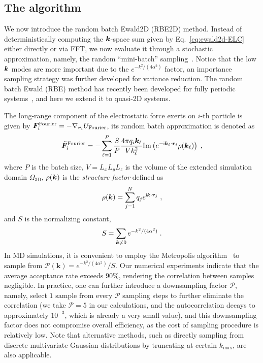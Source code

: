 \subsection{The algorithm}\label{subsec::RBE2D_algorithm}

We now introduce the random batch Ewald2D (RBE2D) method.
Instead of deterministically  {computing} the $\boldsymbol{k}$-space sum  {given by Eq.~\eqref{eq:ewald2d-ELC}} either directly or via FFT, we now evaluate it through a stochastic approximation, namely, the random ``mini-batch'' sampling~\cite{jin2020random}. 
Notice that the low $\boldsymbol{k}$ modes are more important due to the $e^{-k^2/(4\alpha^2)}$ factor, an importance sampling strategy was further developed for variance reduction.
The random batch Ewald (RBE) method has recently been developed for fully periodic systems~\cite{jin2021random,liang2022superscalability, liang2023random}, and here we extend it to quasi-2D systems.

The long-range component of the electrostatic force exerts on $i$-th particle is given by $\boldsymbol{F}_i^{\text{Fourier}}=-\nabla_{\bm{r}_i}U_{\text{Fourier}}$, its random batch approximation is denoted as
\begin{equation}\label{eq:forceRBE}
\begin{aligned}
    \boldsymbol{\tilde{F}}_i^{\text{Fourier}}=-\sum_{\ell =1}^P \frac{S}{P}\frac{4\pi q_i\boldsymbol{k}_\ell}{Vk_\ell^2} \text{Im}\left(e^{-\mathsf i \boldsymbol{k}_\ell\cdot \boldsymbol{r}_i}\rho(\boldsymbol{k}_\ell)\right)\;,
\end{aligned}
\end{equation}
where $P$ is the batch size, $V=L_xL_yL_z$ is the volume of the extended simulation domain $\Omega_{\text{3D}}$, 
 {
$\rho(\boldsymbol{k})$ is the \textit{structure factor} defined as
\begin{equation}
    \rho(\boldsymbol{k})=\sum_{j=1}^N q_j e^{\mathsf i \boldsymbol{k}\cdot \boldsymbol{r}_j}\;,
\end{equation}
}
and $S$ is the normalizing constant,
\begin{equation}\label{eq:normalizingS}
\begin{aligned}
S=\sum_{\boldsymbol{k} \neq 0} e^{-k^2/(4\alpha^2)}\;.
\end{aligned}
\end{equation}
In MD simulations, it is convenient to employ the Metropolis algorithm~\cite{metropolis1953equation} to sample from $\mathscr{P}(\bm{k})=e^{-k^2/(4\alpha^2)}/S$. 
 {Our numerical experiments indicate that the average acceptance rate exceeds $90\%$, rendering the correlation between samples negligible. In practice, one can further introduce a downsampling factor $\mathcal{P}$, namely, select $1$ sample from every $\mathcal{P}$ sampling steps to further eliminate the correlation (we take $\mathcal{P}=5$ in our calculations, and the autocorrelation decays to approximately $10^{-3}$, which is already a very small value), and this downsampling factor does not compromise overall efficiency, as the cost of sampling procedure is relatively low. Note that alternative methods, such as directly sampling from discrete multivariate Gaussian distributions by truncating at certain $k_{\mathrm{max}}$, are also applicable.}

